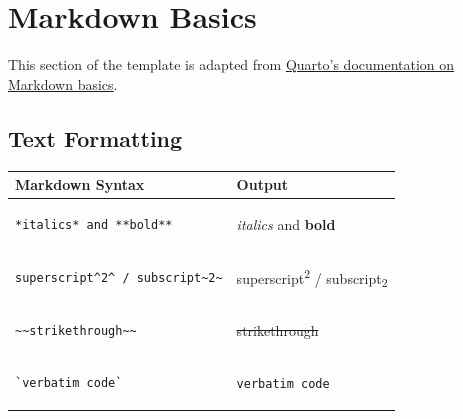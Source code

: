 \documentclass[
]{interact}
\newcounter{none} %
\begin{document}
\section{Markdown Basics}\label{markdown-basics}

This section of the template is adapted from
\href{https://quarto.org/docs/authoring/markdown-basics.html}{Quarto's
documentation on Markdown basics}.

\subsection{Text Formatting}\label{text-formatting}

{\def\LTcaptype{none} %
\begin{longtable}[]{@{}
  >{\raggedright\arraybackslash}p{}
  >{\raggedright\arraybackslash}p{}@{}}
\toprule\noalign{}
\begin{minipage}[b]{\linewidth}\raggedright
Markdown Syntax
\end{minipage} & \begin{minipage}[b]{\linewidth}\raggedright
Output
\end{minipage} \\
\midrule\noalign{}
\endhead
\bottomrule\noalign{}
\endlastfoot
\begin{minipage}[t]{\linewidth}\raggedright
\begin{verbatim}
*italics* and **bold**
\end{verbatim}
\end{minipage} & \emph{italics} and \textbf{bold} \\
\begin{minipage}[t]{\linewidth}\raggedright
\begin{verbatim}
superscript^2^ / subscript~2~
\end{verbatim}
\end{minipage} & superscript\textsuperscript{2} /
subscript\textsubscript{2} \\
\begin{minipage}[t]{\linewidth}\raggedright
\begin{verbatim}
~~strikethrough~~
\end{verbatim}
\end{minipage} & \st{strikethrough} \\
\begin{minipage}[t]{\linewidth}\raggedright
\begin{verbatim}
`verbatim code`
\end{verbatim}
\end{minipage} & \texttt{verbatim\ code} \\
\end{longtable}
}
\end{document}
